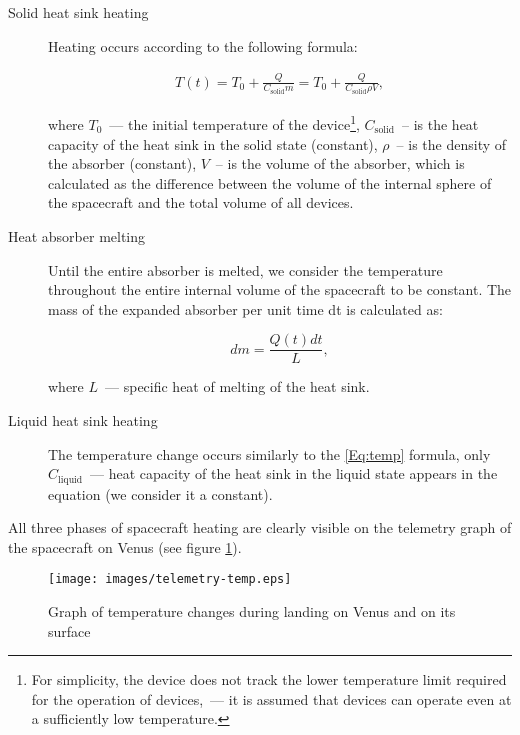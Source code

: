 \documentclass[12pt,a4paper]{article}
\begin{document}
\begin{description}

\item[Solid heat sink heating] Heating occurs according to the following formula:

\begin{eqnarray}
T(t) = T_0 + \frac{Q}{C_{\text{solid}}m} = T_0 + \frac{Q}{C_{\text{solid}}\rho V}, \label{Eq:temp}
\end{eqnarray}

where $T_0$~--- the initial temperature of the device\footnote{For simplicity, the device does not track the lower temperature limit required for the operation of devices,~--- it is assumed that devices can operate even at a sufficiently low temperature.}, $C_ {\text{solid}}$~-- is the heat capacity of the heat sink in the solid state (constant), $\rho$~-- is the density of the absorber (constant), $V$~-- is the volume of the absorber, which is calculated as the difference between the volume of the internal sphere of the spacecraft and the total volume of all devices.

\item[Heat absorber melting] Until the entire absorber is melted, we consider the temperature throughout the entire internal volume of the spacecraft to be constant. The mass of the expanded absorber per unit time dt is calculated as:

  $$
dm = \frac{Q(t)dt}{L},
$$

where $L$~--- specific heat of melting of the heat sink.

\item[Liquid heat sink heating] The temperature change occurs similarly to the \ref{Eq:temp} formula, only $C_{\text{liquid}}$~--- heat capacity of the heat sink in the liquid state appears in the equation (we consider it a constant).

\end{description}

All three phases of spacecraft heating are clearly visible on the telemetry graph of the spacecraft on Venus (see figure \ref{Pic:venus_telemetry_temp}).

\begin{figure}[tbh]
  \begin{center}
    \texttt{[image: images/telemetry-temp.eps]}
    \caption{Graph of temperature changes during landing on Venus and on its surface}
    \label{Pic:venus_telemetry_temp}
  \end{center}
\end{figure}
\end{document}
